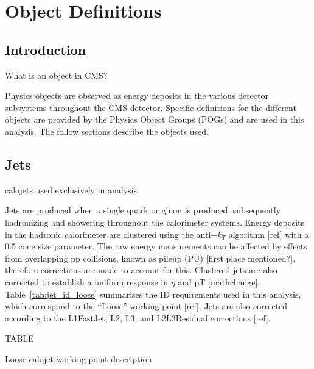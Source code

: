 \chapter{Object Definitions}

\ifpdf
    \graphicspath{{Chapter4/Figs/Raster/}{Chapter4/Figs/PDF/}{Chapter4/Figs/}}
\else
    \graphicspath{{Chapter4/Figs/Vector/}{Chapter4/Figs/}}
\fi


\section{Introduction}  %
\label{sec:objects_introduction}
What is an object in CMS?

Physics objects are observed as energy deposits in the various detector 
subsystems throughout the CMS detector. Specific definitions for the different 
objects are provided by the Physics Object Groups (POGs) and are used in this 
analysis. The follow sections describe the objects used.


\section{Jets}  %
\label{sec:objects_jets}
calojets used exclusively in analysis

Jets are produced when a single quark or gluon is produced, subsequently 
hadronizing and showering throughout the calorimeter systems. Energy deposits in
the hadronic calorimeter are clustered using the anti$-k_T$ algorithm [ref] with
a 0.5 cone size parameter. The raw energy measurements can be affected by 
effects from overlapping pp collisions, known as pileup (PU) [first place 
mentioned?], therefore corrections are made to account for this. Clustered jets 
are also corrected to establish a uniform response in $\eta$ and pT [mathchange].
Table~\ref{tab:jet_id_loose} summarises the ID requirements used in this 
analysis, which correspond to the ``Loose'' working point [ref]. Jets are also 
corrected according to the L1FastJet, L2, L3, and L2L3Residual corrections [ref].


\begin{table}
TABLE
\caption{Loose calojet working point description}
\label{tab:jet_id_loose}
\end{table}



